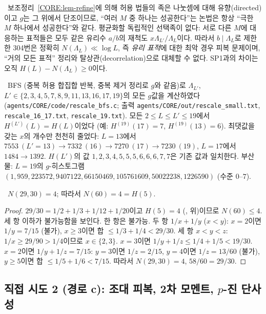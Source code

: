 \begin{remark}[경로 b의 정확한 실패 지점]\label{CORE:rem-routeb-fail}
\PROVED\ 보조정리~\ref{CORE:lem-refine}에 의해 허용 법들의 족은 나눗셈에 대해 유향(directed)이고 $g$는 그 위에서 단조이므로, ``여러 $M$ 중 하나는 성공한다''는 논법은 항상 ``극한 $M$ 하나에서 성공한다''와 같다. 평균화할 독립적인 선택족이 없다: 서로 다른 $M$에 대응하는 표적들은 모두 같은 유리수 $a/b$의 재척도 $x\Lambda_{L'}/\Lambda_L$이다. 따라서 $b\mid\Lambda_L$로 제한한 304번은 정확히 $N(\Lambda_L)\ll\log L$, 즉 \emph{유리 표적}에 대한 최악 경우 피복 문제이며, ``거의 모든 표적'' 정리와 탈상관(decorrelation)으로 대체할 수 없다. SP1과의 차이는 오직 $H(L)-N(\Lambda_L)\ge0$이다.
\end{remark}

\begin{proposition}\label{CORE:prop-routeb-num}
\NUMERIC\ BFS (중복 허용 합집합 반복, 중복 제거 정리로 $g$와 같음)로 $\Lambda_{L'}$, $L'\in\{2,3,4,5,7,8,9,11,13,16,17,19\}$의 모든 $g$값을 계산하였다
(\texttt{agents/CORE/code/rescale\_bfs.c}; 출력 \texttt{agents/CORE/out/rescale\_small.txt}, \texttt{rescale\_16\_17.txt}, \texttt{rescale\_19.txt}). 모든 $2\le L\le L'\le19$에서 $H^{(L')}(L)=H(L)$이었다 (예: $H^{(19)}(17)=7$, $H^{(19)}(13)=6$). 최댓값을 갖는 $x$의 개수만 천천히 줄었다: $L=13$에서 $7553\ (L'=13)\to7332\ (16)\to7270\ (17)\to7230\ (19)$, $L=17$에서 $1484\to1392$. $H(L')$의 값 $1,2,3,4,5,5,5,6,6,6,7,7$은 기존 값과 일치한다. 부산물: $L=19$의 $g$-히스토그램 $(1,959,223572,9407122,66150469,105761609,50022238,1226590)$ (수준 $0$–$7$).
\end{proposition}

\begin{proposition}[$N(\Lambda_5)=H(5)=4$]\label{CORE:prop-N60}
\PROVED\ $N(29,30)=4$; 따라서 $N(60)=4=H(5)$.
\end{proposition}
\begin{proof}
$29/30=1/2+1/3+1/12+1/20$이고 $H(5)=4$ (\NUMERIC, 위)이므로 $N(60)\le4$. 세 항 이하가 불가능함을 보인다. 한 항은 불가능. 두 항 $1/x+1/y$ ($x<y$): $x=2$이면 $1/y=7/15$ (불가), $x\ge3$이면 합 $\le1/3+1/4<29/30$. 세 항 $x<y<z$: $1/x\ge29/90>1/4$이므로 $x\in\{2,3\}$. $x=3$이면 $1/y+1/z\le1/4+1/5<19/30$. $x=2$이면 $1/y+1/z=7/15$: $y=3$이면 $1/z=2/15$, $y=4$이면 $1/z=13/60$ (불가), $y\ge5$이면 합 $\le1/5+1/6<7/15$. 따라서 $N(29,30)=4$, $58/60=29/30$.
\end{proof}

\subsection{직접 시도 2 (경로 c): 조대 피복, 2차 모멘트, $p$-진 단사성}
\label{CORE:ssec-routec}

